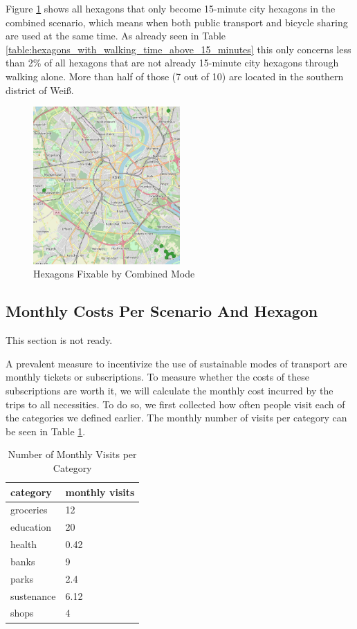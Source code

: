 Figure \ref{fig:combined_hexagons} shows all hexagons that only become 15-minute city hexagons in the combined scenario, which means when both public transport and bicycle sharing are used at the same time.
As already seen in Table \ref{table:hexagons_with_walking_time_above_15_minutes} this only concerns less than 2\% of all hexagons that are not already 15-minute city hexagons through walking alone.
More than half of those (7 out of 10) are located in the southern district of Weiß.
\begin{figure}
  \begin{center}
    \includegraphics[width=0.50\textwidth]{Figures/results/problematic_hexagons/combined_hexagons}
  \end{center}
  \caption{Hexagons Fixable by Combined Mode}
  \label{fig:combined_hexagons}
\end{figure}


\subsection{Monthly Costs Per Scenario And Hexagon}
This section is not ready.

A prevalent measure to incentivize the use of sustainable modes of transport are monthly tickets or subscriptions.
To measure whether the costs of these subscriptions are worth it, we will calculate the monthly cost incurred by the trips to all necessities.
To do so, we first collected how often people visit each of the categories we defined earlier.
The monthly number of visits per category can be seen in Table \ref{tab:monthly_visits}.

\begin{table}
  \caption{Number of Monthly Visits per Category}
  \label{tab:monthly_visits}
  \begin{center}
    \begin{tabular}[c]{l|l}
      category & monthly visits \\
      \hline
      groceries & 12 \\
      education & 20 \\
      health & 0.42 \\
      banks & 9 \\
      parks & 2.4 \\
      sustenance & 6.12 \\
      shops & 4 \\
      \hline
    \end{tabular}
  \end{center}
\end{table}

